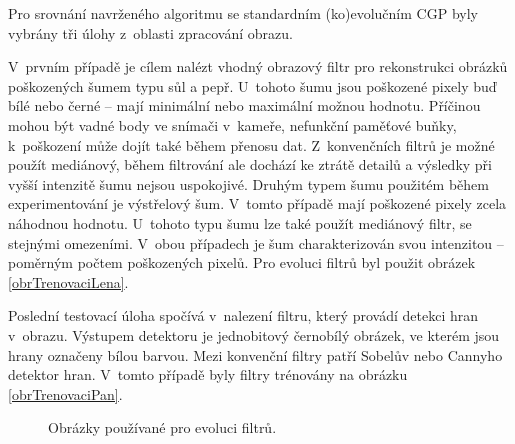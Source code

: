 Pro srovnání navrženého algoritmu se standardním (ko)evolučním CGP byly vybrány tři úlohy z~oblasti zpracování obrazu.

V~prvním případě je cílem nalézt vhodný obrazový filtr pro rekonstrukci obrázků poškozených šumem typu sůl a pepř. U~tohoto šumu jsou poškozené pixely buď bílé nebo černé -- mají minimální nebo maximální možnou hodnotu. Příčinou mohou být vadné body ve snímači v~kameře, nefunkční paměťové buňky, k~poškození může dojít také během přenosu dat. Z~konvenčních filtrů je možné použít mediánový, během filtrování ale dochází ke ztrátě detailů a výsledky při vyšší intenzitě šumu nejsou uspokojivé. Druhým typem šumu použitém během experimentování je výstřelový šum. V~tomto případě mají poškozené pixely zcela náhodnou hodnotu. U~tohoto typu šumu lze také použít mediánový filtr, se stejnými omezeními. V~obou případech je šum charakterizován svou intenzitou -- poměrným počtem poškozených pixelů. Pro evoluci filtrů byl použit obrázek \ref{obrTrenovaciLena}.

Poslední testovací úloha spočívá v~nalezení filtru, který provádí detekci hran v~obrazu. Výstupem detektoru je jednobitový černobílý obrázek, ve kterém jsou hrany označeny bílou barvou. Mezi konvenční filtry patří Sobelův nebo Cannyho detektor hran. V~tomto případě byly filtry trénovány na obrázku \ref{obrTrenovaciPan}.

\begin{figure}[htb]
    \centering
    \caption{Obrázky používané pro evoluci filtrů.}
    \label{obrTrenovaci}
\end{figure}

